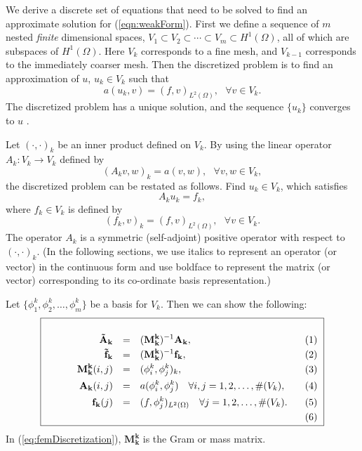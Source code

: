 \documentclass[smallcondensed,final]{svjour3}     %
\begin{document}
We derive a discrete set of equations that need to be
solved to find an approximate solution for 
(\ref{eqn:weakForm}). First we define a sequence of $m$ nested {\em finite}
dimensional spaces, $V_1 \subset V_2 \subset \cdots \subset V_m \subset
H^{1}(\Omega)$, all of which are subspaces of $H^{1}(\Omega)$. Here 
$V_k$ corresponds to a fine mesh, and $V_{k-1}$ corresponds to the
immediately coarser mesh. Then the discretized problem is to find an
approximation of $u$, $u_k \in V_k$ such that
\begin{equation}
\label{eqn:galerkinForm}
a(u_{k},v) = (f,v)_{L^2(\Omega)}, \ \ \ \forall v \in V_k.
\end{equation}
The discretized problem has a unique solution, and the sequence $\{u_k\}$ converges to $u$ \cite{BrennerScott94}.

Let $(\cdot,\cdot)_{k}$ be an inner product defined on $V_k$. By using the linear operator $A_k : V_{k} \rightarrow V_{k} $ defined by
\begin{equation}
\label{eqn:fematDef}
(A_{k} v,w)_k = a(v,w),  \ \ \ \forall v,w \in V_k,
\end{equation}
the discretized problem can be restated as follows. 
Find $u_k \in V_k$, which satisfies
\begin{equation}
\label{eqn:discreteFE}
A_k u_k = f_k,
\end{equation}
where $f_k \in V_k $ is defined by
\begin{equation}
(f_k,v)_k = (f,v)_{L^2(\Omega)},  \ \ \ \forall v \in V_k.  
\end{equation}
The operator $A_k$ is a symmetric (self-adjoint) positive operator
with respect to $(\cdot,\cdot)_k$. (In the following sections, we use italics to
represent an operator (or vector) in the continuous form and use boldface to represent the matrix (or vector) corresponding to its
co-ordinate basis representation.)

Let $\{\phi_1^k,\phi_2^k,\ldots,\phi_{m}^k\}$ be a
basis for $V_k$. Then we can show the following:
\begin{equation}
\label{eq:femDiscretization}
\fbox{
\begin{minipage}[b]{0.8\textwidth}{
\begin{eqnarray*}
\mathbf{\tilde{A}_{k}} &=& (\mathbf{M_{k}^{k}})^{-1}\mathbf{A_{k}},  \\
\mathbf{\tilde{f}_{k}} &=& (\mathbf{M_{k}^{k}})^{-1}\mathbf{f_{k}},  \\
\mathbf{M_k^k}(i,j) &=& (\phi_i^k,\phi_j^k)_k, \\
\mathbf{A_{k}}(i,j) &=& a(\phi_i^k,\phi_j^k)  \ \ \ \forall i,j = 1,2,\ldots,\#(V_k), \\
\mathbf{f_{k}}(j) &=& (f,\phi_j^k)_{L^2(\Omega)}  \ \ \ \forall j=1,2,\ldots,\#(V_k). \\
\end{eqnarray*} 
}\end{minipage}
}
\end{equation}
In (\ref{eq:femDiscretization}), $\mathbf{M_k^k}$ is the Gram or mass matrix.
\end{document}
